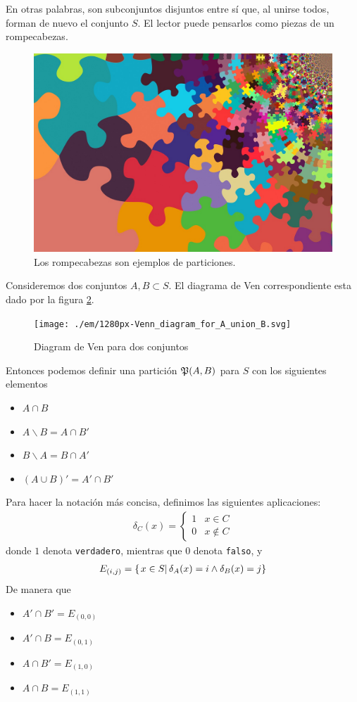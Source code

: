 En otras palabras, son subconjuntos disjuntos entre sí que, al unirse todos, forman de nuevo el conjunto $ S $. El lector puede pensarlos como piezas de un rompecabezas.

\begin{figure}
	\centering
	\includegraphics[width=0.7\linewidth]{./em/puzzle-5294291_1280}
	\caption[Rompecabezas]{Los rompecabezas son ejemplos de particiones.}
	\label{fig:puzzle-52942911280}
\end{figure}

Consideremos dos conjuntos $ A,B \subset S$. El diagrama de Ven correspondiente esta dado por la figura \ref{fig:1280px-venndiagramforaunionb}. 

\begin{figure}
	\centering
	\texttt{[image: ./em/1280px-Venn\_diagram\_for\_A\_union\_B.svg]}
	\caption{Diagram de Ven para dos conjuntos}
	\label{fig:1280px-venndiagramforaunionb}
\end{figure}

Entonces podemos definir una partición $ \mathfrak{P}(A,B) $ para $ S $ con los siguientes elementos
\begin{itemize}
	\item $ A\cap B $
	\item $ A\backslash B = A \cap B'$
	\item $ B\backslash A = B \cap A'$
	\item $ \left(A\cup B\right)' = A'\cap B' $
\end{itemize}

Para hacer la notación más concisa, definimos las siguientes aplicaciones:
\begin{align*}
	\delta_C(x) = \begin{cases}
		1 & x \in C \\
		0 & x \not \in C
	\end{cases}
\end{align*}
donde $ 1 $ denota \texttt{verdadero}, mientras que $ 0 $ denota \texttt{falso}, y
\begin{align*}
	E_{(i,j)}=\left\{ \left.x\in S \right| \delta_{A}(x)=i\wedge\delta_{B}(x)=j \right\}
\end{align*}
De manera que 
\begin{itemize}
	\item $ A' \cap B' = E_{(0,0)}$
	\item $ A'  \cap B = E_{(0,1)}$
	\item $ A \cap B'  = E_{(1,0)}$
	\item $ A  \cap B  = E_{(1,1)}$
\end{itemize}

